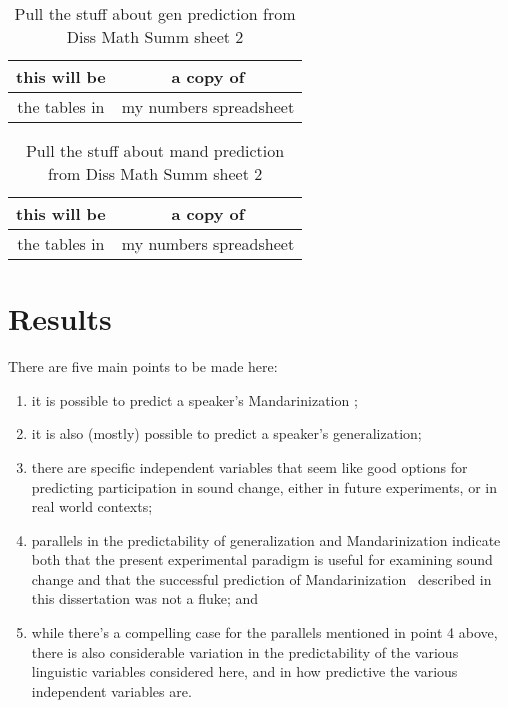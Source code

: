 \begin{table}[]
    \centering
    \begin{tabular}{|c|c|}
        \hline
        this will be & a copy of \\
        \hline
        the tables in & my numbers spreadsheet\\
        \hline
    \end{tabular}
    \caption{Pull the stuff about gen prediction from Diss Math Summ sheet 2}
    \label{tab:generalizationPredictors}
\end{table}

\begin{table}[]
    \centering
    \begin{tabular}{|c|c|}
        \hline
        this will be & a copy of \\
        \hline
        the tables in & my numbers spreadsheet\\
        \hline
    \end{tabular}
    \caption{Pull the stuff about mand prediction from Diss Math Summ sheet 2}
    \label{tab:mandarinizationPredictors}
\end{table}

\section{Results}
There are five main points to be made here:
\begin{enumerate}
    \item it is possible to predict a speaker's Mandarinization \IRL;
    \item it is also (mostly) possible to predict a speaker's generalization;
    \item there are specific independent variables that seem like good options for predicting participation in sound change, either in future experiments, or in real world contexts;
    \item parallels in the predictability of generalization and Mandarinization indicate both that the present experimental paradigm is useful for examining sound change and that the successful prediction of Mandarinization \IRL~described in this dissertation was not a fluke; and
    \item while there's a compelling case for the parallels mentioned in point 4 above, there is also considerable variation in the predictability of the various linguistic variables considered here, and in how predictive the various independent variables are.
\end{enumerate}

